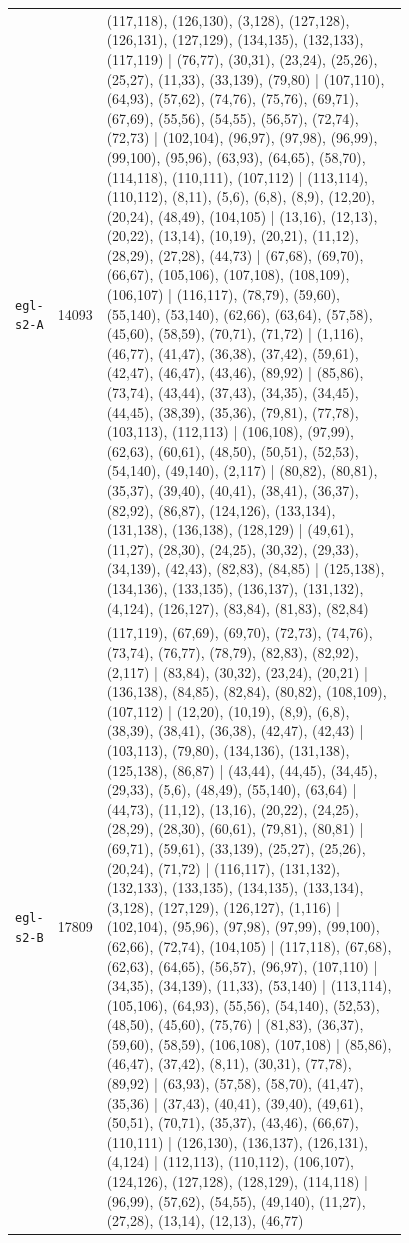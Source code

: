 \begin{landscape}
\begin{longtable}{lr>{\tiny\raggedright\arraybackslash}p{0.78\linewidth}}
\texttt{egl-s2-A} & 14093 & (117,118), (126,130), (3,128), (127,128), (126,131), (127,129), (134,135), (132,133), (117,119) | (76,77), (30,31), (23,24), (25,26), (25,27), (11,33), (33,139), (79,80) | (107,110), (64,93), (57,62), (74,76), (75,76), (69,71), (67,69), (55,56), (54,55), (56,57), (72,74), (72,73) | (102,104), (96,97), (97,98), (96,99), (99,100), (95,96), (63,93), (64,65), (58,70), (114,118), (110,111), (107,112) | (113,114), (110,112), (8,11), (5,6), (6,8), (8,9), (12,20), (20,24), (48,49), (104,105) | (13,16), (12,13), (20,22), (13,14), (10,19), (20,21), (11,12), (28,29), (27,28), (44,73) | (67,68), (69,70), (66,67), (105,106), (107,108), (108,109), (106,107) | (116,117), (78,79), (59,60), (55,140), (53,140), (62,66), (63,64), (57,58), (45,60), (58,59), (70,71), (71,72) | (1,116), (46,77), (41,47), (36,38), (37,42), (59,61), (42,47), (46,47), (43,46), (89,92) | (85,86), (73,74), (43,44), (37,43), (34,35), (34,45), (44,45), (38,39), (35,36), (79,81), (77,78), (103,113), (112,113) | (106,108), (97,99), (62,63), (60,61), (48,50), (50,51), (52,53), (54,140), (49,140), (2,117) | (80,82), (80,81), (35,37), (39,40), (40,41), (38,41), (36,37), (82,92), (86,87), (124,126), (133,134), (131,138), (136,138), (128,129) | (49,61), (11,27), (28,30), (24,25), (30,32), (29,33), (34,139), (42,43), (82,83), (84,85) | (125,138), (134,136), (133,135), (136,137), (131,132), (4,124), (126,127), (83,84), (81,83), (82,84) \\[2pt]
\texttt{egl-s2-B} & 17809 & (117,119), (67,69), (69,70), (72,73), (74,76), (73,74), (76,77), (78,79), (82,83), (82,92), (2,117) | (83,84), (30,32), (23,24), (20,21) | (136,138), (84,85), (82,84), (80,82), (108,109), (107,112) | (12,20), (10,19), (8,9), (6,8), (38,39), (38,41), (36,38), (42,47), (42,43) | (103,113), (79,80), (134,136), (131,138), (125,138), (86,87) | (43,44), (44,45), (34,45), (29,33), (5,6), (48,49), (55,140), (63,64) | (44,73), (11,12), (13,16), (20,22), (24,25), (28,29), (28,30), (60,61), (79,81), (80,81) | (69,71), (59,61), (33,139), (25,27), (25,26), (20,24), (71,72) | (116,117), (131,132), (132,133), (133,135), (134,135), (133,134), (3,128), (127,129), (126,127), (1,116) | (102,104), (95,96), (97,98), (97,99), (99,100), (62,66), (72,74), (104,105) | (117,118), (67,68), (62,63), (64,65), (56,57), (96,97), (107,110) | (34,35), (34,139), (11,33), (53,140) | (113,114), (105,106), (64,93), (55,56), (54,140), (52,53), (48,50), (45,60), (75,76) | (81,83), (36,37), (59,60), (58,59), (106,108), (107,108) | (85,86), (46,47), (37,42), (8,11), (30,31), (77,78), (89,92) | (63,93), (57,58), (58,70), (41,47), (35,36) | (37,43), (40,41), (39,40), (49,61), (50,51), (70,71), (35,37), (43,46), (66,67), (110,111) | (126,130), (136,137), (126,131), (4,124) | (112,113), (110,112), (106,107), (124,126), (127,128), (128,129), (114,118) | (96,99), (57,62), (54,55), (49,140), (11,27), (27,28), (13,14), (12,13), (46,77) \\[2pt]

\end{longtable}
\end{landscape}
